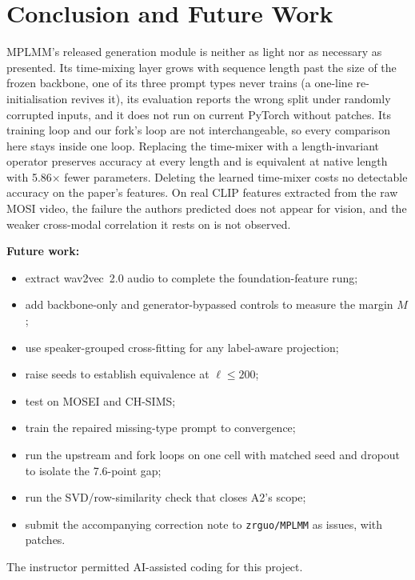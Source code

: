 \documentclass[lettersize,journal]{IEEEtran}
\begin{document}
\section{Conclusion and Future Work}
MPLMM's released generation module is neither as light nor as necessary as presented. Its time-mixing layer grows with sequence length past the size of the frozen backbone, one of its three prompt types never trains (a one-line re-initialisation revives it), its evaluation reports the wrong split under randomly corrupted inputs, and it does not run on current PyTorch without patches. Its training loop and our fork's loop are not interchangeable, so every comparison here stays inside one loop. Replacing the time-mixer with a length-invariant operator preserves accuracy at every length and is equivalent at native length with 5.86$\times$ fewer parameters. Deleting the learned time-mixer costs no detectable accuracy on the paper's features. On real CLIP features extracted from the raw MOSI video, the failure the authors predicted does not appear for vision, and the weaker cross-modal correlation it rests on is not observed.

\textbf{Future work:}
\begin{itemize}
\item extract wav2vec~2.0 audio to complete the foundation-feature rung;
\item add backbone-only and generator-bypassed controls to measure the margin $M$;
\item use speaker-grouped cross-fitting for any label-aware projection;
\item raise seeds to establish equivalence at $\ell\le200$;
\item test on MOSEI and CH-SIMS;
\item train the repaired missing-type prompt to convergence;
\item run the upstream and fork loops on one cell with matched seed and dropout to isolate the 7.6-point gap;
\item run the SVD/row-similarity check that closes A2's scope;
\item submit the accompanying correction note to \texttt{zrguo/MPLMM} as issues, with patches.
\end{itemize}




The instructor permitted AI-assisted coding for this project.
\end{document}
